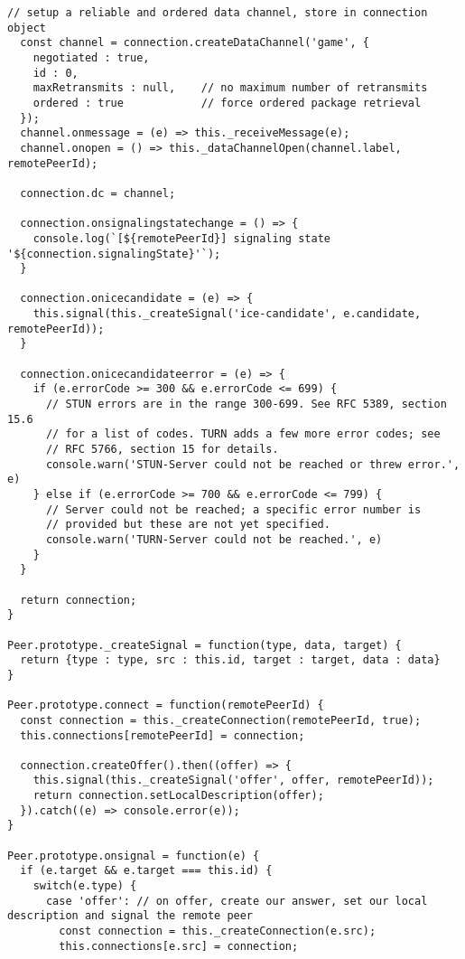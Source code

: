 \begin{singlespace}
\begin{lstlisting}[]
  // setup a reliable and ordered data channel, store in connection object
  const channel = connection.createDataChannel('game', {
    negotiated : true,
    id : 0,
    maxRetransmits : null,    // no maximum number of retransmits
    ordered : true            // force ordered package retrieval
  });
  channel.onmessage = (e) => this._receiveMessage(e);
  channel.onopen = () => this._dataChannelOpen(channel.label, remotePeerId);

  connection.dc = channel;

  connection.onsignalingstatechange = () => {
    console.log(`[${remotePeerId}] signaling state '${connection.signalingState}'`);
  }

  connection.onicecandidate = (e) => {
    this.signal(this._createSignal('ice-candidate', e.candidate, remotePeerId));
  }

  connection.onicecandidateerror = (e) => {
    if (e.errorCode >= 300 && e.errorCode <= 699) {
      // STUN errors are in the range 300-699. See RFC 5389, section 15.6
      // for a list of codes. TURN adds a few more error codes; see
      // RFC 5766, section 15 for details.
      console.warn('STUN-Server could not be reached or threw error.', e)
    } else if (e.errorCode >= 700 && e.errorCode <= 799) {
      // Server could not be reached; a specific error number is
      // provided but these are not yet specified.
      console.warn('TURN-Server could not be reached.', e)
    }
  }

  return connection;
}

Peer.prototype._createSignal = function(type, data, target) {
  return {type : type, src : this.id, target : target, data : data}
}

Peer.prototype.connect = function(remotePeerId) {
  const connection = this._createConnection(remotePeerId, true);
  this.connections[remotePeerId] = connection;

  connection.createOffer().then((offer) => {
    this.signal(this._createSignal('offer', offer, remotePeerId));
    return connection.setLocalDescription(offer);
  }).catch((e) => console.error(e));
}

Peer.prototype.onsignal = function(e) {
  if (e.target && e.target === this.id) {
    switch(e.type) {
      case 'offer': // on offer, create our answer, set our local description and signal the remote peer
        const connection = this._createConnection(e.src);
        this.connections[e.src] = connection;


\end{lstlisting}
\end{singlespace}
